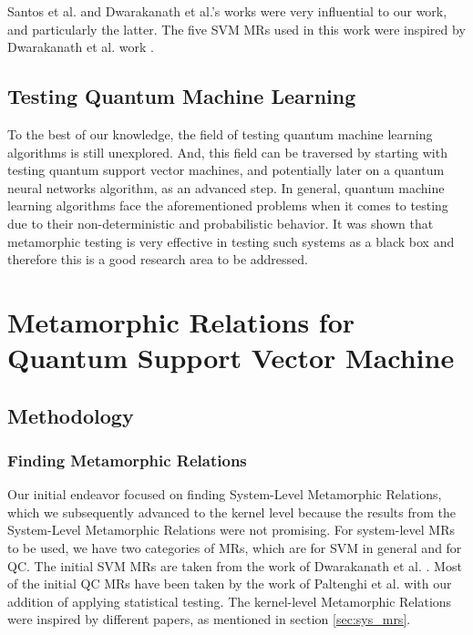 \documentclass[12pt,a4paper]{article}
\begin{document}
	Santos et al. \cite{ssantos2020} and Dwarakanath et al.'s \cite{Dwarakanath2018} works were very influential to our work, and particularly the latter. The five SVM MRs used in this work were inspired by Dwarakanath et al. work \cite{Dwarakanath2018}.
	
	\subsection{Testing Quantum Machine Learning}
	
	To the best of our knowledge, the field of testing quantum machine learning algorithms is still unexplored. And, this field can be traversed by starting with testing quantum support vector machines, and potentially later on a quantum neural networks algorithm, as an advanced step. In general, quantum machine learning algorithms face the aforementioned problems when it comes to testing due to their non-deterministic and probabilistic behavior. It was shown that metamorphic testing is very effective in testing such systems as a black box and therefore this is a good research area to be addressed.
	
	
	\section{Metamorphic Relations for Quantum Support Vector Machine}
	\label{sec:Metamorphic_Relations_for_Quantum_Support_Vector_Machine}
	
	\subsection{Methodology}
	
	\subsubsection{Finding Metamorphic Relations}
	
	Our initial endeavor focused on finding System-Level Metamorphic Relations, which we subsequently advanced to the kernel level because the results from the System-Level Metamorphic Relations were not promising. For system-level MRs to be used, we have two categories of MRs, which are for SVM in general and for QC. The initial SVM MRs are taken from the work of Dwarakanath et al. \cite{Dwarakanath2018}. Most of the initial QC MRs have been taken by the work of Paltenghi et al. \cite{Paltenghi2023} with our addition of applying statistical testing. The kernel-level Metamorphic Relations were inspired by different papers, as mentioned in section \ref{sec:sys_mrs}.
	
\end{document}
